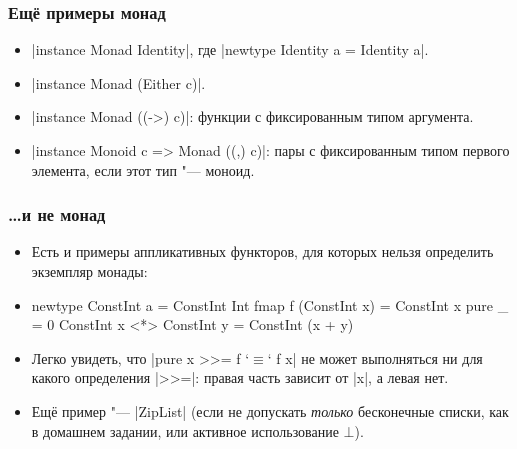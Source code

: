 \documentclass[11pt]{beamer}
\begin{document}
\begin{frame}[fragile]
\frametitle{Ещё примеры монад}
\begin{itemize}
    \item \haskinline|instance Monad Identity|, где \haskinline|newtype Identity a = Identity a|.
    \item \haskinline|instance Monad (Either c)|.
    \item \haskinline|instance Monad ((->) c)|: функции с фиксированным типом аргумента.
    \item \haskinline|instance Monoid c => Monad ((,) c)|: пары с фиксированным типом первого элемента, если этот тип "--- моноид.
\end{itemize}
\end{frame}

\begin{frame}[fragile]
\frametitle{\ldots и не монад}
\begin{itemize}
    \item Есть и примеры аппликативных функторов, для которых нельзя определить экземпляр монады:
    \item 
    \begin{haskell}
    newtype ConstInt a = ConstInt Int
    fmap f (ConstInt x) = ConstInt x
    pure _ = 0
    ConstInt x <*> ConstInt y = ConstInt (x + y)
    \end{haskell}
    \item Легко увидеть, что \haskinline|pure x >>= f `$\equiv$` f x| не может выполняться ни для какого определения \haskinline|>>=|: правая часть зависит от \haskinline|x|, а левая нет.
    \pause
    \item Ещё пример "--- \haskinline|ZipList| (если не допускать \emph{только} бесконечные списки, как в домашнем задании, или активное использование $\bot$).
\end{itemize}
\end{frame}
\end{document}
